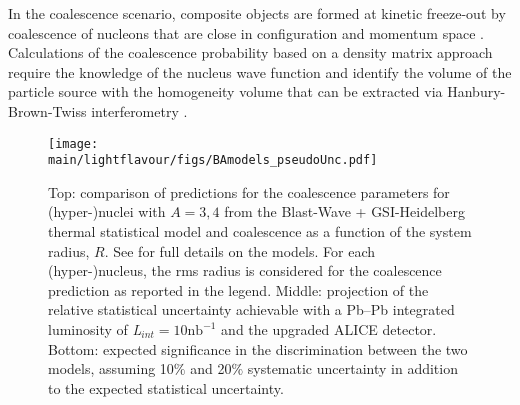 In the coalescence scenario, composite objects are formed at kinetic freeze-out by coalescence of nucleons that are close in configuration and momentum space \cite{Butler:1963, Kapusta:1980, Bergstrom:1979gpv, Sato:1981ez, Nagle:1996vp, Scheibl:1998tk}. Calculations of the coalescence probability based on a density matrix approach \cite{Scheibl:1998tk} require the knowledge of the nucleus wave function and identify the volume of the particle source with the homogeneity volume that can be extracted via Hanbury-Brown-Twiss interferometry \cite{Wiedemann:1999qn}. 
\begin{figure}[t]
\begin{center}
\texttt{[image: \\main/lightflavour/figs/BAmodels\_pseudoUnc.pdf]}
\end{center}
\caption{
Top: comparison of predictions for the coalescence parameters for (hyper-)nuclei with $A = 3, 4$ from the Blast-Wave + GSI-Heidelberg thermal statistical model and coalescence as a function of the system radius, $R$. See \cite{Bellini:2018epz} for full details on the models. For each (hyper-)nucleus, the rms radius is considered for the coalescence prediction as reported in the legend. Middle: projection of the relative statistical uncertainty achievable with a Pb--Pb integrated luminosity of \textit{L}$_{int} = 10 \mathrm{nb}^{-1}$ and the upgraded ALICE detector. Bottom: expected significance in the discrimination between the two models, assuming 10$\%$ and 20$\%$ systematic uncertainty in addition to the expected statistical uncertainty.}
\label{fig:BAmodels}
\end{figure}

